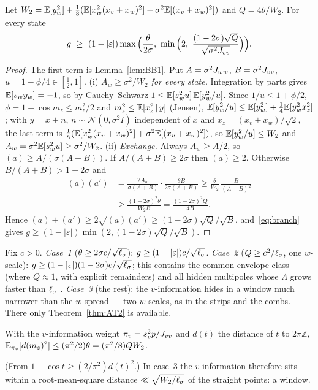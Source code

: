 \begin{theorem} \proofst
\label{thm:BC1}
Let $W_2=\mathbb{E}[y_w^2]+\tfrac18(\mathbb{E}[x_w^2(x_v+x_w)^2]+\sigma^2\mathbb{E}[(x_v+x_w)^2])$ and $Q=4\theta/W_2$. For every state
\begin{equation}
g\ \ge\ (1-|\varepsilon|)\max\Big(\frac{\theta}{2\sigma},\ \min\Big(2,\ \frac{(1-2\sigma)\sqrt Q}{\sqrt{\sigma^2\Jvv}}\Big)\Big).
\end{equation}
\end{theorem}
\begin{proof}
The first term is Lemma~\ref{lem:BB1}. Put $A=\sigma^2J_{ww}$, $B=\sigma^2J_{vv}$, $u=1-\phi/4\in[\tfrac12,1]$.
(i) \emph{$A_w\ge\sigma^2/W_2$ for every state.} Integration by parts gives $\mathbb{E}[s_wy_w]=-1$, so by Cauchy--Schwarz
$1\le\mathbb{E}[s_w^2u]\,\mathbb{E}[y_w^2/u]$. Since $1/u\le1+\phi/2$, $\phi=1-\cos m_z\le m_z^2/2$ and $m_z^2\le\mathbb{E}[x_z^2\,|\,y]$ (Jensen),
$\mathbb{E}[y_w^2/u]\le\mathbb{E}[y_w^2]+\tfrac14\mathbb{E}[y_w^2x_z^2]$; with $y=x+n$, $n\sim\mathcal N(0,\sigma^2I)$ independent of $x$ and $x_z=(x_v+x_w)/\sqrt2$, the last term is
$\tfrac18(\mathbb{E}[x_w^2(x_v+x_w)^2]+\sigma^2\mathbb{E}[(x_v+x_w)^2])$, so $\mathbb{E}[y_w^2/u]\le W_2$ and $A_w=\sigma^2\mathbb{E}[s_w^2u]\ge\sigma^2/W_2$.
(ii) \emph{Exchange.} Always $A_w\ge A/2$, so $(a)\ge A/(\sigma(A+B))$. If $A/(A+B)\ge2\sigma$ then $(a)\ge2$. Otherwise $B/(A+B)>1-2\sigma$ and
\[
\begin{aligned}(a)(a')&=\frac{2A_w}{\sigma(A+B)}\cdot\frac{\theta B}{2\sigma(A+B)}\ge\frac{\theta}{W_2}\,\frac{B}{(A+B)^2}\\&\ge\frac{(1-2\sigma)^2\theta}{W_2B}=\frac{(1-2\sigma)^2Q}{4B}.\end{aligned}
\]
Hence $(a)+(a')\ge2\sqrt{(a)(a')}\ge(1-2\sigma)\sqrt Q/\sqrt B$, and~\eqref{eq:branch} gives $g\ge(1-|\varepsilon|)\min(2,(1-2\sigma)\sqrt Q/\sqrt B)$.
\end{proof}

Fix $c>0$. \emph{Case~1} ($\theta\ge2\sigma c/\sqrt{\ell_\sigma}$): $g\ge(1-|\varepsilon|)c/\sqrt{\ell_\sigma}$. \emph{Case~2} ($Q\ge c^2/\ell_\sigma$, one $w$-scale):
$g\ge(1-|\varepsilon|)(1-2\sigma)c/\sqrt{\ell_\sigma}$; this contains the common-envelope class (where $Q\approx1$, with explicit remainders)
and all hidden multipoles whose $\Lambda$ grows faster than $\ell_\sigma$ \proofst. \emph{Case~3} (the rest): the $v$-information hides in a window
much narrower than the $w$-spread --- two $w$-scales, as in the strips and the combs. There only Theorem~\ref{thm:AT2} is available.

\begin{lemma} \proofst
\label{lem:BD1}
With the $v$-information weight $\pi_v=s_v^2p/J_{vv}$ and $d(t)$ the distance of $t$ to $2\pi\mathbb Z$, $\mathbb{E}_{\pi_v}[d(m_z)^2]\le(\pi^2/2)\theta=(\pi^2/8)QW_2$.
\end{lemma}
(From $1-\cos t\ge(2/\pi^2)d(t)^2$.) In case~3 the $v$-information therefore sits within a root-mean-square distance $\ll\sqrt{W_2/\ell_\sigma}$ of
the straight points: a window.


